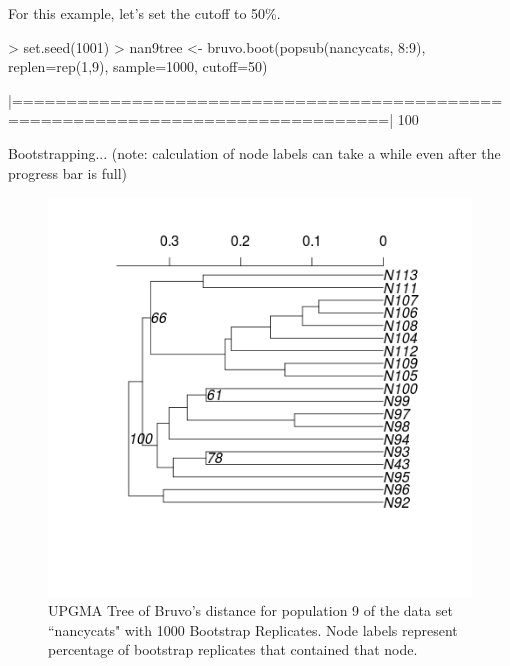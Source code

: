 \documentclass[letterpaper]{article}
\begin{document}
For this example, let's set the cutoff to 50\%.
\begin{Schunk}
\begin{Sinput}
> set.seed(1001)
> nan9tree <- bruvo.boot(popsub(nancycats, 8:9), replen=rep(1,9), sample=1000, cutoff=50)
\end{Sinput}
\end{Schunk}
\begin{Schunk}
\begin{Soutput}
|================================================================================| 100%
\end{Soutput}
\begin{Soutput}
Bootstrapping... (note: calculation of node labels can take a while even after the progress bar is full)
\end{Soutput}
\end{Schunk}
\begin{figure}[h!]
  \centering
  \caption{\footnotesize UPGMA Tree of Bruvo's distance for population 9 of the data set ``nancycats" with 1000 Bootstrap Replicates. Node labels represent percentage of bootstrap replicates that contained that node.}
  \label{bruvo_upgma}
  \includegraphics{bruvo_upgma.png}


\end{figure}
\end{document}
